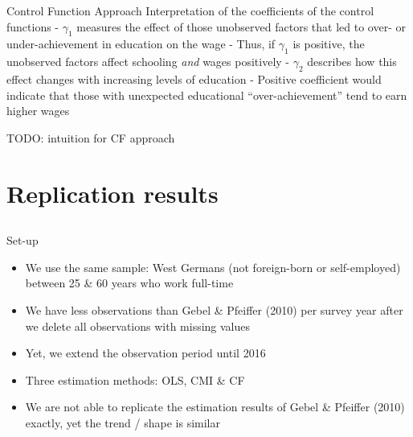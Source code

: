 \documentclass[10pt,ignorenonframetext,]{beamer}
\providecommand{\tightlist}{%
  \setlength{\itemsep}{0pt}\setlength{\parskip}{0pt}}
\begin{document}
\begin{frame}[allowframebreaks]{Control Function Approach}
Interpretation of the coefficients of the control functions -
\(\gamma_1\) measures the effect of those unobserved factors that led to
over- or under-achievement in education on the wage - Thus, if
\(\gamma_1\) is positive, the unobserved factors affect schooling
\emph{and} wages positively - \(\gamma_2\) describes how this effect
changes with increasing levels of education - Positive coefficient would
indicate that those with unexpected educational ``over-achievement''
tend to earn higher wages

TODO: intuition for CF approach

\end{frame}

\hypertarget{replication-results}{%
\section{Replication results}\label{replication-results}}

\hypertarget{section}{%
\subsection{}\label{section}}

\begin{frame}{Set-up}
\protect\hypertarget{set-up}{}

\begin{itemize}
\tightlist
\item
  We use the same sample: West Germans (not foreign-born or
  self-employed) between 25 \& 60 years who work full-time
\item
  We have less observations than Gebel \& Pfeiffer (2010) per survey
  year after we delete all observations with missing values
\item
  Yet, we extend the observation period until 2016
\item
  Three estimation methods: OLS, CMI \& CF
\item
  We are not able to replicate the estimation results of Gebel \&
  Pfeiffer (2010) exactly, yet the trend / shape is similar
\end{itemize}

\end{frame}
\end{document}
